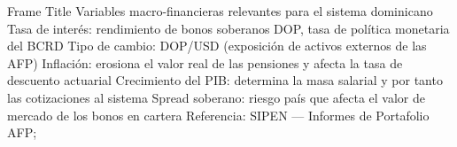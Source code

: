 \documentclass{beamer}
\begin{document}
\begin{frame}{Frame Title}
Variables macro-financieras relevantes para el sistema dominicano
Tasa de interés: rendimiento de bonos soberanos DOP, tasa de política monetaria del BCRD
Tipo de cambio: DOP/USD (exposición de activos externos de las AFP)
Inflación: erosiona el valor real de las pensiones y afecta la tasa de descuento actuarial
Crecimiento del PIB: determina la masa salarial y por tanto las cotizaciones al sistema
Spread soberano: riesgo país que afecta el valor de mercado de los bonos en cartera
Referencia: SIPEN — Informes de Portafolio AFP;
    
\end{frame}
\end{document}
